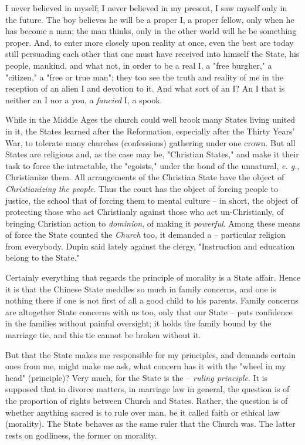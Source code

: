 I never believed in myself; I never believed in my present, I saw myself only 
in the future. The boy believes he will be a proper I, a proper fellow, only 
when he has become a man; the man thinks, only in the other world will he be 
something proper. And, to enter more closely upon reality at once, even the 
best are today still persuading each other that one must have received into 
himself the State, his people, mankind, and what not, in order to be a real I, 
a "{}free burgher,"{} a "{}citizen,"{} a "{}free or true man"{}; they too see 
the truth and reality of me in the reception of an alien I and devotion to it. 
And what sort of an I? An I that is neither an I nor a you, a \textit{fancied} 
I, a spook.

While in the Middle Ages the church could well brook many States living united 
in it, the States learned after the Reformation, especially after the Thirty 
Years' War, to tolerate many churches (confessions) gathering under one crown. 
But all States are religious and, as the case may be, "{}Christian States,"{} 
and make it their task to force the intractable, the "{}egoists,"{} under the 
bond of the unnatural, \textit{e. g.}, Christianize them. All arrangements of 
the Christian State have the object of \textit{Christianizing the people}. 
Thus the court has the object of forcing people to justice, the school that of 
forcing them to mental culture -- in short, the object of protecting those who 
act Christianly against those who act un-Christianly, of bringing Christian 
action to \textit{dominion}, of making it \textit{powerful}. Among these means 
of force the State counted the \textit{Church} too, it demanded a -- 
particular religion from everybody. Dupin said lately against the clergy, 
"{}Instruction and education belong to the State."{}

Certainly everything that regards the principle of morality is a State affair. 
Hence it is that the Chinese State meddles so much in family concerns, and one 
is nothing there if one is not first of all a good child to his parents. 
Family concerns are altogether State concerns with us too, only that our State 
-- puts confidence in the families without painful oversight; it holds the 
family bound by the marriage tie, and this tie cannot be broken without it.

But that the State makes me responsible for my principles, and demands certain 
ones from me, might make me ask, what concern has it with the "{}wheel in my 
head"{} (principle)? Very much, for the State is the -- \textit{ruling 
principle}. It is supposed that in divorce matters, in marriage law in 
general, the question is of the proportion of rights between Church and 
States. Rather, the question is of whether anything sacred is to rule over 
man, be it called faith or ethical law (morality). The State behaves as the 
same ruler that the Church was. The latter rests on godliness, the former on 
morality.

